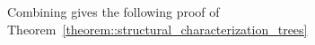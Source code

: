 \documentclass[11pt]{report}
\newtheorem{lemma}{Lemma}
\begin{document}



Combining gives the following proof of Theorem~\eqref{theorem::structural_characterization_trees}
\end{document}
